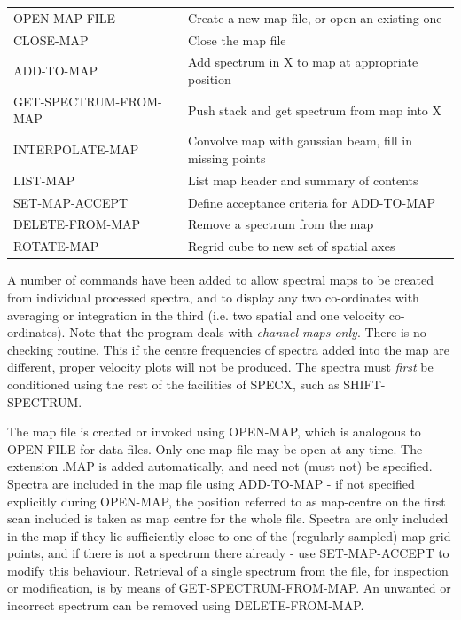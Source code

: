 \documentclass[11pt,twoside]{report}
\begin{document}
\begin{tabular}{ll}
OPEN-MAP-FILE           & Create a new map file, or open an existing one\\
CLOSE-MAP               & Close the map file\\
ADD-TO-MAP              & Add spectrum in X to map at appropriate position\\
GET-SPECTRUM-FROM-MAP   & Push stack and get spectrum from map into X\\
INTERPOLATE-MAP         & Convolve map with gaussian beam, fill in missing points\\
LIST-MAP                & List map header and summary of contents\\
SET-MAP-ACCEPT          & Define acceptance criteria for ADD-TO-MAP\\
DELETE-FROM-MAP         & Remove a spectrum from the map\\
ROTATE-MAP              & Regrid cube to new set of spatial axes\\
\end{tabular}

A number of commands have been added to allow spectral maps to be created
from individual processed spectra, and to display any two co-ordinates with
averaging or integration in the third (i.e. two spatial and one velocity
co-ordinates). Note that the program deals with {\em channel maps only}.
 There is no checking routine. This if the centre
frequencies of spectra added into the map are different, proper velocity plots
will not be produced. The spectra must {\em first} be conditioned using the
rest of the facilities of SPECX, such as SHIFT-SPECTRUM. 

The map file is created or invoked using OPEN-MAP, which is analogous to
OPEN-FILE for data files. Only one map file may be open at any time.
 The extension .MAP is added
automatically, and need not (must not) be specified. Spectra are included in the
map file using ADD-TO-MAP - if not specified explicitly during OPEN-MAP, the
position referred to as map-centre on the first scan included is taken as map
centre for the whole file. Spectra are only included in the map if they lie
sufficiently close to one of the (regularly-sampled) map grid points, and if
there is not a spectrum there already - use SET-MAP-ACCEPT to modify this
behaviour. Retrieval of a single spectrum from the file, for inspection or
modification, is by means of GET-SPECTRUM-FROM-MAP. An unwanted or incorrect
spectrum can be removed using DELETE-FROM-MAP. 
\end{document}
